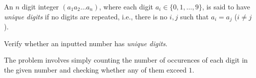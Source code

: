 

\problem An $n$ digit integer $(a_1a_2\dots a_n)$, where each digit $a_i \in \{0, 1, \dots, 9\}$,
is said to have {\em unique digits} if no digits are repeated, i.e., there is no $i, j$ such that $a_i = a_j$ ($i \neq j$).

Verify whether an inputted number has {\em unique digits}.

\solution The problem involves simply counting the number of occurences of each digit in the given number and checking whether any of them exceed $1$.


\sourcecode
